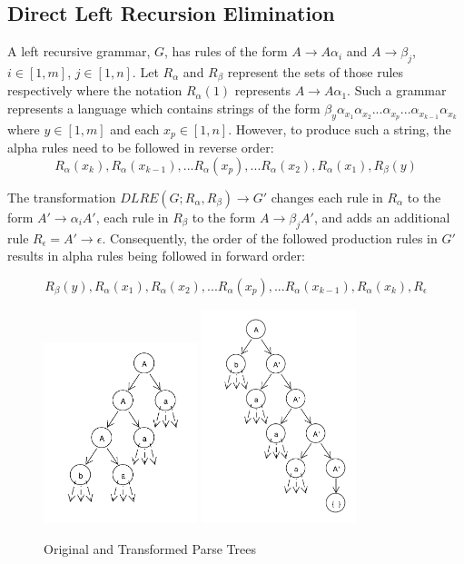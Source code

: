 \documentclass[11pt]{article}
\begin{document}
\subsection{Direct Left Recursion Elimination}
A left recursive grammar, $G$, has rules of the form
$A \rightarrow A \alpha_i$ and $A \rightarrow \beta_j$, $i \in [1,m]$, $j \in [1,n]$.
Let $R_\alpha$ and $R_\beta$ represent the sets of those rules respectively where the notation
$R_\alpha(1)$ represents $A \rightarrow A \alpha_1$. 
Such a grammar represents a language which contains strings of the form
$\beta_y \alpha_{x_1} \alpha_{x_2} ... \alpha_{x_p}...\alpha_{x_{k-1}} \alpha_{x_k}$ where $y \in [1,m]$ and each $x_p \in [1,n]$.
However, to produce such a string, the alpha rules need to be followed in reverse order:
\[R_\alpha(x_k), R_\alpha(x_{k-1}), ... R_\alpha(x_{p}), ... R_\alpha(x_2), R_\alpha(x_1), R_\beta(y)\]

The transformation $DLRE(G; R_\alpha, R_\beta) \rightarrow G'$ changes
each rule in $R_\alpha$ to the form $A' \rightarrow \alpha_i A'$, each rule
in $R_\beta$ to the form $A \rightarrow \beta_j A'$, and adds an additional rule
$R_\epsilon = A' \rightarrow \epsilon$. Consequently, the order of the followed production
rules in $G'$ results in alpha rules being followed in forward order:

\[R_\beta(y), R_\alpha(x_1), R_\alpha(x_2), ... R_\alpha(x_p), ... R_\alpha(x_{k-1}),R_\alpha(x_k), R_\epsilon \]

\begin{figure}[h!]
    \centering
    \includegraphics[width=0.4\textwidth,natwidth=1,natheight=1]{dlre_orig.pdf}
    \includegraphics[width=0.4\textwidth,natwidth=1,natheight=1]{dlre_comp.pdf}
    \caption{Original and Transformed Parse Trees}
    \label{fig:dlre}
\end{figure}
\end{document}
